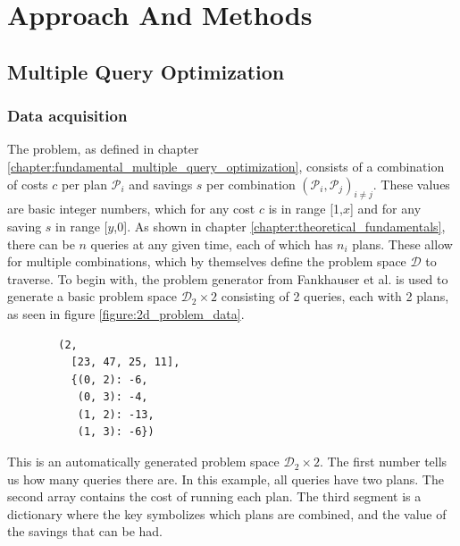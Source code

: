 \chapter{Approach And Methods} %

\label{chapter:approach_and_methods} %

\def \blochwidth {0.3}
\newcommand{\plani}{$\mathcal{P}_i$}
\newcommand{\planj}{$\mathcal{P}_j$}
\newcommand{\querya}{$\mathcal{Q}_a$}
\newcommand{\queryb}{$\mathcal{Q}_b$}

\renewcommand{\cellalign}{lc}
\renewcommand{\theadalign}{cc}
\renewcommand\theadgape{\Gape[4pt]}
\renewcommand\theadfont{\normalsize}
\renewcommand\cellgape{\Gape[5pt]}
\renewcommand*{\arraystretch}{1.2}
\section{Multiple Query Optimization}

\subsection{Data acquisition}
\label{chapter:mqo_data_acquisition}

The problem, as defined in chapter \ref{chapter:fundamental_multiple_query_optimization}, consists of a combination of costs $c$ per plan $\mathcal{P}_i$ and savings $s$ per combination $
\left(\mathcal{P}_i,\mathcal{P}_j\right)_{i \neq j}$. These values are basic integer numbers, which for any cost $c$ is in range [1,$x$] and for any saving $s$ in range [$y$,0]. As shown in chapter \ref{chapter:theoretical_fundamentals}, there can be $n$ queries at any given time, each of which has $n_i$ plans. These allow for multiple combinations, which by themselves define the problem space $\mathcal{D}$ to traverse. To begin with, the problem generator from Fankhauser et al.\cite{fankhauser_multiple_2021} is used to generate a basic problem space $\mathcal{D}_2\times2$ consisting of 2 queries, each with 2 plans, as seen in figure \ref{figure:2d_problem_data}.

\begin{listing}[!ht]
    \centering
    \begin{verbatim}
        (2,
          [23, 47, 25, 11],
          {(0, 2): -6,
           (0, 3): -4,
           (1, 2): -13,
           (1, 3): -6})
    \end{verbatim}
    \caption{This is an automatically generated problem space $\mathcal{D}_2\times2$. The first number tells us how many queries there are. In this example, all queries have two plans. The second array contains the cost of running each plan. The third segment is a dictionary where the key symbolizes which plans are combined, and the value of the savings that can be had.}
    \label{figure:2d_problem_data}
\end{listing}

